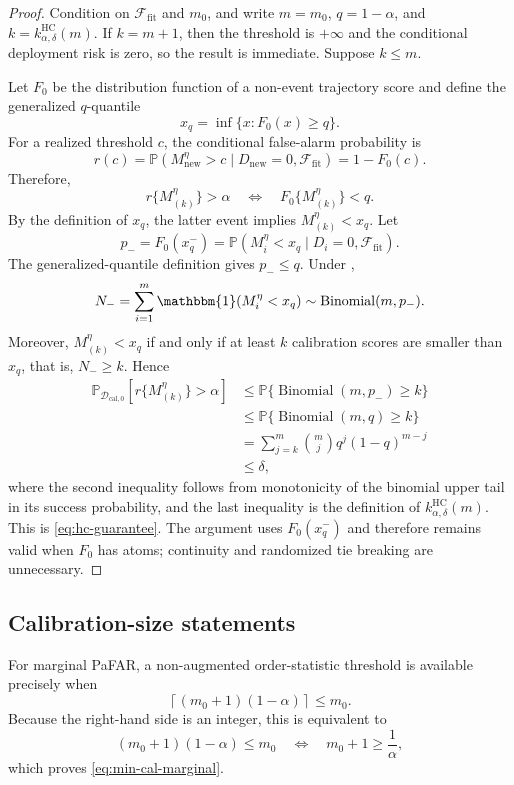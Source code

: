\documentclass[11pt]{article}
\newcommand{\Pp}{\mathbb{P}}
\newcommand{\Ind}{\mathbbm{1}}
\newcommand{\calD}{\mathcal{D}}
\newcommand{\calF}{\mathcal{F}}
\begin{document}
\begin{proof}
Condition on $\calF_{\mathrm{fit}}$ and $m_0$, and write $m=m_0$, $q=1-\alpha$, and $k=k_{\alpha,\delta}^{\mathrm{HC}}(m)$. If $k=m+1$, then the threshold is $+\infty$ and the conditional deployment risk is zero, so the result is immediate. Suppose $k\le m$.

Let $F_0$ be the distribution function of a non-event trajectory score and define the generalized $q$-quantile
\[
x_q=\inf\{x:F_0(x)\ge q\}.
\]
For a realized threshold $c$, the conditional false-alarm probability is
\[
r(c)=\Pp(M_{\mathrm{new}}^{\eta}>c\mid D_{\mathrm{new}}=0,\calF_{\mathrm{fit}})
=1-F_0(c).
\]
Therefore,
\[
r\{M_{(k)}^{\eta}\}>\alpha
\quad\Longleftrightarrow\quad
F_0\{M_{(k)}^{\eta}\}<q.
\]
By the definition of $x_q$, the latter event implies $M_{(k)}^{\eta}<x_q$. Let
\[
p_-=F_0(x_q^-)=\Pp(M_i^{\eta}<x_q\mid D_i=0,\calF_{\mathrm{fit}}).
\]
The generalized-quantile definition gives $p_-\le q$. Under ,
\[
N_-=\sum_{i=1}^{m}\Ind(M_i^{\eta}<x_q)
\sim\operatorname{Binomial}(m,p_-).
\]
Moreover, $M_{(k)}^{\eta}<x_q$ if and only if at least $k$ calibration scores are smaller than $x_q$, that is, $N_-\ge k$. Hence
\begin{align*}
\Pp_{\calD_{\mathrm{cal},0}}\!
\left[r\{M_{(k)}^{\eta}\}>\alpha\right]
&\le \Pp\{\operatorname{Binomial}(m,p_-)\ge k\}\\
&\le \Pp\{\operatorname{Binomial}(m,q)\ge k\}\\
&=\sum_{j=k}^{m}\binom{m}{j}q^j(1-q)^{m-j}\\
&\le\delta,
\end{align*}
where the second inequality follows from monotonicity of the binomial upper tail in its success probability, and the last inequality is the definition of $k_{\alpha,\delta}^{\mathrm{HC}}(m)$. This is \eqref{eq:hc-guarantee}. The argument uses $F_0(x_q^-)$ and therefore remains valid when $F_0$ has atoms; continuity and randomized tie breaking are unnecessary.
\end{proof}

\subsection{Calibration-size statements}

For marginal PaFAR, a non-augmented order-statistic threshold is available precisely when
\[
\left\lceil(m_0+1)(1-\alpha)\right\rceil\le m_0.
\]
Because the right-hand side is an integer, this is equivalent to
\[
(m_0+1)(1-\alpha)\le m_0
\quad\Longleftrightarrow\quad
m_0+1\ge\frac{1}{\alpha},
\]
which proves \eqref{eq:min-cal-marginal}.
\end{document}
